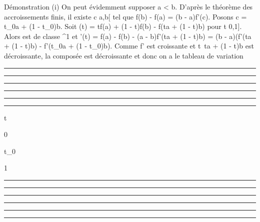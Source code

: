 \documentclass[]{article}
\begin{document}
Démonstration (i) On peut évidemment supposer a \textless{} b. D'après
le théorème des accroissements finis, il existe c \in{]}a,b{[} tel que
f(b) - f(a) = (b - a)f'(c). Posons c = t\_0a + (1 -
t\_0)b. Soit \phi(t) = tf(a) + (1 - t)f(b) - f(ta + (1 - t)b) pour
t \in {[}0,1{]}. Alors \phi est de classe ^1 et \phi'(t) = f(a) -
f(b) - (a - b)f'(ta + (1 - t)b) = (b - a)(f'(ta + (1 - t)b) -
f'(t\_0a + (1 - t\_0)b). Comme f' est croissante et
t\mapsto~ta + (1 - t)b est décroissante, la composée
est décroissante et donc on a le tableau de variation

\begin{center}\rule{3in}{0.4pt}\end{center}

\begin{center}\rule{3in}{0.4pt}\end{center}

\begin{center}\rule{3in}{0.4pt}\end{center}

\begin{center}\rule{3in}{0.4pt}\end{center}

\begin{center}\rule{3in}{0.4pt}\end{center}

\begin{center}\rule{3in}{0.4pt}\end{center}

t

0

t\_0

1

\begin{center}\rule{3in}{0.4pt}\end{center}

\begin{center}\rule{3in}{0.4pt}\end{center}

\begin{center}\rule{3in}{0.4pt}\end{center}

\begin{center}\rule{3in}{0.4pt}\end{center}

\begin{center}\rule{3in}{0.4pt}\end{center}

\begin{center}\rule{3in}{0.4pt}\end{center}
\end{document}
